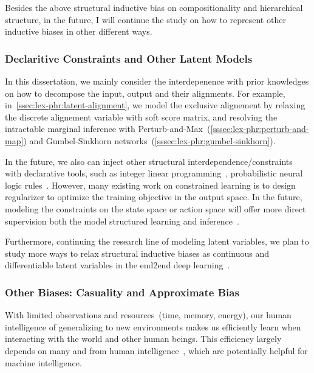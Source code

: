 Besides the above structural inductive bias on compositionality and
hierarchical structure, in the future, I will continue the study on how
to represent other inductive biases in other different ways.

\subsubsection{Declaritive Constraints and Other Latent Models}
\label{sssec:future:constraints}
In this dissertation, we mainly consider the interdepenence with prior
knowledges on how to decompose the input, output and their alignments.
For example, in~\autoref{ssec:lex-phr:latent-alignment}, we model the
exclusive alignement by relaxing the discrete alignement variable with
soft score matrix, and resolving the intractable marginal inference
with Perturb-and-Max~(\autoref{sssec:lex-phr:perturb-and-map}) and
Gumbel-Sinkhorn networks~(\autoref{sssec:lex-phr:gumbel-sinkhorn}).

In the future, we also can inject other structural
interdependence/constraints with declarative tools, such as integer
linear programming~\citep{roth2007global}, probabilistic neural logic
rules~\citep{bach2017hinge,li2019augmenting,pacheco2021modeling,marra2019integrating}.
However, many existing work on constrained learning is to design
regularizer to optimize the training objective in the output space.
In the future, modeling the constraints on the state space or action
space will offer more direct supervision both the model structured learning and
inference~\cite{lu-etal-2022-neurologic}.

Furthermore, continuing the research line of modeling latent
variables, we plan to study more ways to relax structural inductive
biases as continuous and differentiable latent variables in the
end2end deep learning~\citep{yin2018structvae, corro2019learning}.

\subsubsection{Other Biases: Casuality and Approximate Bias}
\label{sssec:future:approx-biases}
With limited observations and resources~(time, memory, energy), our
human intelligence of generalizing to new environments makes us
efficiently learn when interacting with the world and other human
beings. This efficiency largely depends on many 
and  from human
intelligence~\cite{Gershman2021WhatMU}, which are potentially helpful
for machine intelligence.

